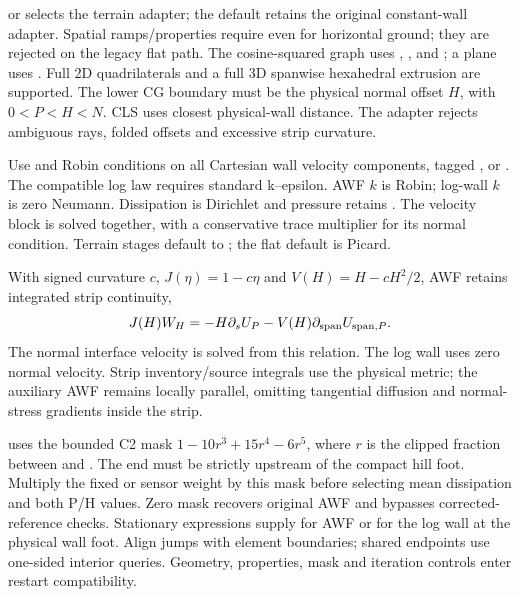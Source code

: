  or  selects the terrain
adapter; the default  retains the original constant-wall adapter.
Spatial ramps/properties require  even for horizontal ground;
they are rejected on the legacy flat path.
The cosine-squared graph uses ,
,  and
; a plane uses .
Full 2D quadrilaterals and a full 3D spanwise hexahedral extrusion are supported.
The lower CG boundary must be the physical normal offset $H$, with $0<P<H<N$.
CLS uses closest physical-wall distance. The adapter rejects ambiguous rays,
folded offsets and excessive strip curvature.

Use  and Robin conditions on all Cartesian
wall velocity components, tagged , 
or . The compatible log law requires standard k--epsilon.
AWF $k$ is Robin; log-wall $k$ is zero Neumann. Dissipation is Dirichlet and
pressure retains . The velocity block is solved together,
with a conservative trace multiplier for its normal condition. Terrain stages
default to ; the flat default is Picard.

With signed curvature $c$, $J(\eta)=1-c\eta$ and
$V(H)=H-cH^2/2$, AWF retains integrated strip continuity,
\[
 J(H)W_H=-H\partial_s U_P-V(H)\partial_{\rm span}U_{{\rm span},P}.
\]
The normal interface velocity is solved from this relation. The log wall uses
zero normal velocity. Strip inventory/source integrals use the physical metric;
the auxiliary AWF remains locally parallel, omitting tangential diffusion and
normal-stress gradients inside the strip.

 uses the bounded C2 mask
$1-10r^3+15r^4-6r^5$, where $r$ is the clipped fraction between
 and .
The end must be strictly upstream of the compact hill foot. Multiply the fixed
or sensor weight by this mask before selecting mean dissipation and both P/H
values. Zero mask recovers original AWF and bypasses corrected-reference checks.
Stationary  expressions supply 
for AWF or  for the log wall at the physical wall foot. Align jumps
with element boundaries; shared endpoints use one-sided interior queries.
Geometry, properties, mask and iteration controls enter restart compatibility.


